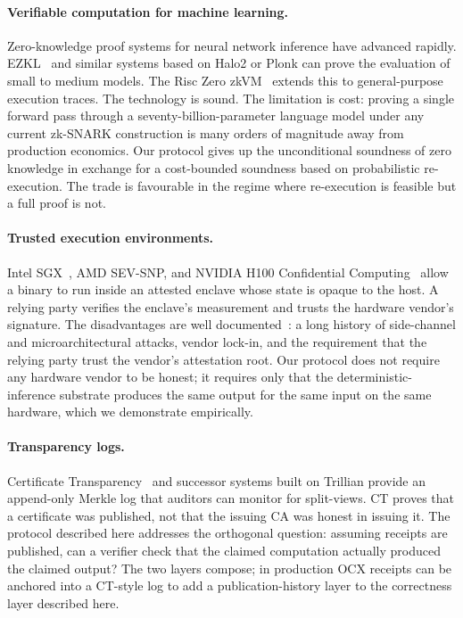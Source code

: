 \documentclass[10pt]{article}
\begin{document}
\paragraph{Verifiable computation for machine learning.} Zero-knowledge proof systems for neural network inference have advanced rapidly. EZKL~\cite{ezkl} and similar systems based on Halo2 or Plonk can prove the evaluation of small to medium models. The Risc Zero zkVM~\cite{risczero} extends this to general-purpose execution traces. The technology is sound. The limitation is cost: proving a single forward pass through a seventy-billion-parameter language model under any current zk-SNARK construction is many orders of magnitude away from production economics. Our protocol gives up the unconditional soundness of zero knowledge in exchange for a cost-bounded soundness based on probabilistic re-execution. The trade is favourable in the regime where re-execution is feasible but a full proof is not.

\paragraph{Trusted execution environments.} Intel SGX~\cite{sgx}, AMD SEV-SNP, and NVIDIA H100 Confidential Computing~\cite{h100cc} allow a binary to run inside an attested enclave whose state is opaque to the host. A relying party verifies the enclave's measurement and trusts the hardware vendor's signature. The disadvantages are well documented~\cite{sgxattacks}: a long history of side-channel and microarchitectural attacks, vendor lock-in, and the requirement that the relying party trust the vendor's attestation root. Our protocol does not require any hardware vendor to be honest; it requires only that the deterministic-inference substrate produces the same output for the same input on the same hardware, which we demonstrate empirically.

\paragraph{Transparency logs.} Certificate Transparency~\cite{ct} and successor systems built on Trillian provide an append-only Merkle log that auditors can monitor for split-views. CT proves that a certificate was published, not that the issuing CA was honest in issuing it. The protocol described here addresses the orthogonal question: assuming receipts are published, can a verifier check that the claimed computation actually produced the claimed output? The two layers compose; in production OCX receipts can be anchored into a CT-style log to add a publication-history layer to the correctness layer described here.
\end{document}
